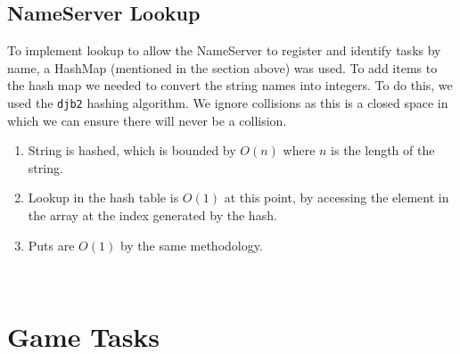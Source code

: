 \documentclass[12pt]{article}
\begin{document}
\subsection{NameServer Lookup}
To implement lookup to allow the NameServer to register and identify tasks by name, a HashMap (mentioned in the section above) was used.  To add items to the hash map we needed to convert the string names into integers.  To do this, we used the \texttt{djb2} hashing algorithm.  We ignore collisions as this is a closed space in which we can ensure there will never be a collision.
\begin{enumerate}
  \item String is hashed, which is bounded by $O(n)$ where $n$ is the length of the string.
  \item Lookup in the hash table is $O(1)$ at this point, by accessing the element in the array at the index generated by the hash.
  \item Puts are $O(1)$ by the same methodology.
\end{enumerate}
\\[2\baselineskip]

\section{Game Tasks}
\end{document}
